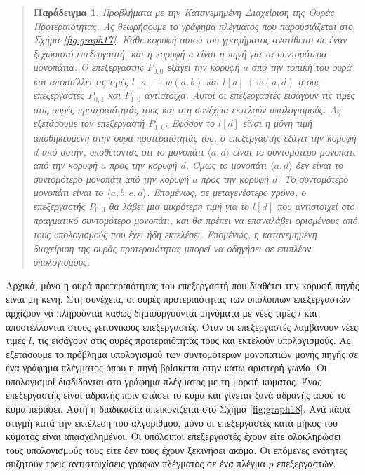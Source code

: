 \documentclass[12pt,a4paper]{article} %
\newtheorem{paradeigma}{Παράδειγμα}
\begin{document}
{{\begin{quote}
\begin{paradeigma} \label{par:1} Προβλήματα με την Κατανεμημένη Διαχείριση της Ουράς Προτεραιότητας.
Ας θεωρήσουμε το γράφημα πλέγματος που παρουσιάζεται στο Σχήμα \ref{fig:graph17}.
Κάθε κορυφή αυτού του γραφήματος ανατίθεται σε έναν ξεχωριστό επεξεργαστή,
και η κορυφή $a$ είναι η πηγή για τα συντομότερα μονοπάτια. Ο
επεξεργαστής $P_{0,0}$ εξάγει την κορυφή $a$ από την τοπική του ουρά
και αποστέλλει τις τιμές $l[a] + w(a, b)$ και $l[a] + w(a, d)$ στους
επεξεργαστές $P_{0,1}$ και $P_{1,0}$ αντίστοιχα. Αυτοί οι επεξεργαστές
εισάγουν τις τιμές στις ουρές προτεραιότητάς τους και στη συνέχεια
εκτελούν υπολογισμούς. Ας εξετάσουμε τον επεξεργαστή $P_{1,0}$. Εφόσον
το $l[d]$ είναι η μόνη τιμή αποθηκευμένη στην ουρά προτεραιότητάς του,
ο επεξεργαστής εξάγει την κορυφή $d$ από αυτήν, υποθέτοντας ότι το
μονοπάτι $\langle a, d \rangle$ είναι το συντομότερο μονοπάτι από την
κορυφή $a$ προς την κορυφή $d$. Όμως το μονοπάτι $\langle a, d \rangle$
δεν είναι το συντομότερο μονοπάτι από την κορυφή $a$ προς την κορυφή
$d$. Το συντομότερο μονοπάτι είναι το $\langle a, b, e, d \rangle$.
Επομένως, σε μεταγενέστερο χρόνο, ο επεξεργαστής $P_{0,0}$ θα λάβει
μια μικρότερη τιμή για το $l[d]$ που αντιστοιχεί στο πραγματικό
συντομότερο μονοπάτι, και θα πρέπει να επαναλάβει ορισμένους από τους
υπολογισμούς που έχει ήδη εκτελέσει. Επομένως, η κατανεμημένη
διαχείριση της ουράς προτεραιότητας μπορεί να οδηγήσει σε επιπλέον
υπολογισμούς.
\end{paradeigma}
\end{quote}

Αρχικά, μόνο η ουρά προτεραιότητας του επεξεργαστή που διαθέτει την
κορυφή πηγής είναι μη κενή. Στη συνέχεια, οι ουρές προτεραιότητας των
υπόλοιπων επεξεργαστών αρχίζουν να πληρούνται καθώς δημιουργούνται
μηνύματα με νέες τιμές $l$ και αποστέλλονται στους γειτονικούς
επεξεργαστές. Όταν οι επεξεργαστές λαμβάνουν νέες τιμές $l$, τις
εισάγουν στις ουρές προτεραιότητάς τους και εκτελούν υπολογισμούς.
Ας εξετάσουμε το πρόβλημα υπολογισμού των συντομότερων μονοπατιών
μονής πηγής σε ένα γράφημα πλέγματος όπου η πηγή βρίσκεται στην κάτω αριστερή γωνία. Οι υπολογισμοί διαδίδονται στο
γράφημα πλέγματος με τη μορφή κύματος. Ένας επεξεργαστής είναι αδρανής
πριν φτάσει το κύμα και γίνεται ξανά αδρανής αφού το κύμα περάσει.
Αυτή η διαδικασία απεικονίζεται στο Σχήμα \ref{fig:graph18}. Ανά πάσα στιγμή κατά
την εκτέλεση του αλγορίθμου, μόνο οι επεξεργαστές κατά μήκος του
κύματος είναι απασχολημένοι. Οι υπόλοιποι επεξεργαστές έχουν είτε
ολοκληρώσει τους υπολογισμoύς τους είτε δεν τους έχουν ξεκινήσει ακόμα.
Οι επόμενες ενότητες συζητούν τρεις αντιστοιχίσεις γράφων πλέγματος
σε ένα πλέγμα $p$ επεξεργαστών.
\vspace{0.3cm}
\begin{figure}[H]
\centering
\begin{tikzpicture}[scale=1.0]


\end{tikzpicture}
\end{figure}}}
\end{document}
